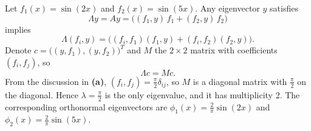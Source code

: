 \documentclass{homework}
\begin{document}
\begin{solution}
Let $f_1(x) = \sin(2x)$ and $f_2(x) = \sin(5x)$.  Any eigenvector $y$ satisfies
$$
  \Lambda y = A y = \big((f_1,y)\,f_1 + (f_2,y)\,f_2\big)
$$
implies
$$
  \Lambda (f_i,y) = \big( (f_i,f_1) (f_1,y) + (f_i,f_2) (f_2,y)\big).
$$
Denote $c = \Big( (y,f_1), (y,f_2) \Big)^T$ and $ M$ the $2\times 2$ matrix with coefficients $(f_i,f_j)$, so
$$
  \Lambda c = M c. 
$$
From the discussion in {\bf (a)}, $(f_i,f_j) = \frac \pi2\delta_{ij}$, so $M$ is a diagonal matrix with $\frac \pi 2$ on the diagonal. Hence $\lambda = \frac \pi 2$ is the only eigenvalue, and it has multiplicity 2. The corresponding orthonormal eigenvectors are $\phi_1(x) = \frac 2\pi \sin(2x)$ and $\phi_2(x) = \frac 2\pi\sin(5x)$.
%
%  
\end{solution}
\newpage
{}
\end{document}

